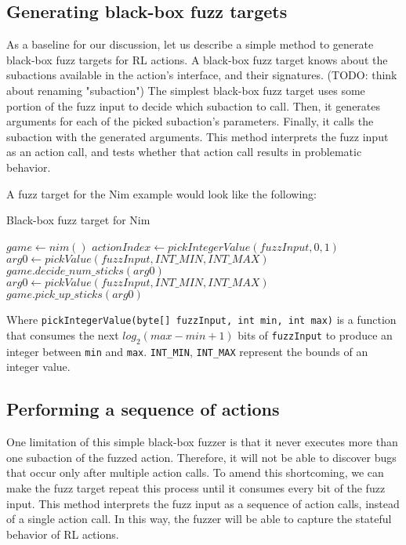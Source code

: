 \subsection{Generating black-box fuzz targets} \label{blackboxFuzzTargets}
As a baseline for our discussion, let us describe a simple method to generate black-box fuzz targets for RL actions.
A black-box fuzz target knows about the subactions available in the action's interface, and their signatures. (TODO: think about renaming "subaction")
The simplest black-box fuzz target uses some portion of the fuzz input to decide which subaction to call.
Then, it generates arguments for each of the picked subaction's parameters.
Finally, it calls the subaction with the generated arguments.
This method interprets the fuzz input as an action call, and tests whether that action call results in problematic behavior.

A fuzz target for the Nim example would look like the following:
\begin{algorithm}[H]
    \caption{Black-box fuzz target for Nim}
    \begin{algorithmic}[1]
    \STATE $game \gets nim()$
    \STATE $actionIndex \gets pickIntegerValue(fuzzInput, 0, 1)$
        \STATE $arg0 \gets pickValue(fuzzInput, INT\_MIN, INT\_MAX)$
        \STATE $game.decide\_num\_sticks(arg0)$
    \ENDIF
        \STATE $arg0 \gets pickValue(fuzzInput, INT\_MIN, INT\_MAX)$
        \STATE $game.pick\_up\_sticks(arg0)$
    \ENDIF
    \end{algorithmic}
\end{algorithm}
Where \texttt{pickIntegerValue(byte[] fuzzInput, int min, int max)} is a function that consumes the next $log_2(max - min + 1)$ bits of \texttt{fuzzInput}
 to produce an integer between \texttt{min} and \texttt{max}.
 \texttt{INT\_MIN}, \texttt{INT\_MAX} represent the bounds of an integer value.

\subsection{Performing a sequence of actions}
One limitation of this simple black-box fuzzer is that it never executes more than one subaction of the fuzzed action.
Therefore, it will not be able to discover bugs that occur only after multiple action calls.
To amend this shortcoming, we can make the fuzz target repeat this process until it consumes every bit of the fuzz input.
This method interprets the fuzz input as a sequence of action calls, instead of a single action call.
In this way, the fuzzer will be able to capture the stateful behavior of RL actions.

